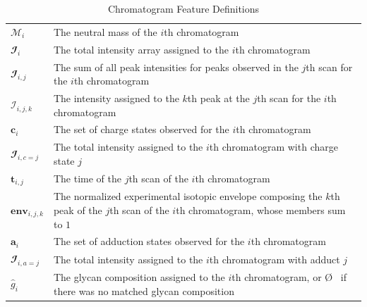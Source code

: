     \renewcommand{\arraystretch}{1.5}
    \begin{table}
        \caption{Chromatogram Feature Definitions}\label{tbl:chromatogram_feature_definitions}
        \centering
        \begin{tabular}{l | p{9cm}}
            \hline
            $\mathcal{M}_i$ & The neutral mass of the $i$th chromatogram\\
            $\mathbfcal{I}_i$ & The total intensity array assigned to the $i$th chromatogram\\
            $\mathbfcal{I}_{i, j}$ & The sum of all peak intensities for peaks observed in
                                             the $j$th scan for the $i$th chromatogram\\
            $\mathcal{I}_{i, j, k}$ & The intensity assigned to the $k$th peak at the $j$th
                                      scan for the $i$th chromatogram\\
            $\mathbf{c}_i$ & The set of charge states observed for the $i$th chromatogram\\
            $\mathbfcal{I}_{i, c=j}$ & The total intensity assigned to the $i$th chromatogram
                                     with charge state $j$\\
            $\mathbf{t}_{i, j}$ & The time of the $j$th scan of the $i$th chromatogram\\
            $\textbf{env}_{i, j, k}$ & The normalized experimental isotopic envelope composing
                                     the $k$th peak of the $j$th scan of the $i$th chromatogram,
                                     whose members sum to $1$\\
            $\mathbf{a}_i$ & The set of adduction states observed for the $i$th chromatogram\\
            $\mathbfcal{I}_{i, a=j}$ & The total intensity assigned to the $i$th
                                                 chromatogram with adduct $j$\\
            ${\hat g}_i$ & The glycan composition assigned to the $i$th chromatogram, or \O
                           \ if there was no matched glycan composition
        \end{tabular}
    \end{table}
    \renewcommand{\arraystretch}{1.0}

